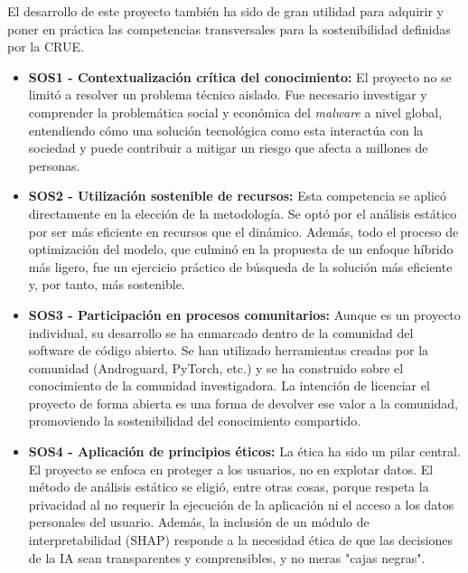 El desarrollo de este proyecto también ha sido de gran utilidad para adquirir y poner en práctica las competencias transversales para la sostenibilidad definidas por la CRUE.

\begin{itemize}
	\item \textbf{SOS1 - Contextualización crítica del conocimiento:} El proyecto no se limitó a resolver un problema técnico aislado. Fue necesario investigar y comprender la problemática social y económica del \textit{malware} a nivel global, entendiendo cómo una solución tecnológica como esta interactúa con la sociedad y puede contribuir a mitigar un riesgo que afecta a millones de personas.
	
	\item \textbf{SOS2 - Utilización sostenible de recursos:} Esta competencia se aplicó directamente en la elección de la metodología. Se optó por el análisis estático por ser más eficiente en recursos que el dinámico. Además, todo el proceso de optimización del modelo, que culminó en la propuesta de un enfoque híbrido más ligero, fue un ejercicio práctico de búsqueda de la solución más eficiente y, por tanto, más sostenible.
	
	\item \textbf{SOS3 - Participación en procesos comunitarios:} Aunque es un proyecto individual, su desarrollo se ha enmarcado dentro de la comunidad del software de código abierto. Se han utilizado herramientas creadas por la comunidad (Androguard, PyTorch, etc.) y se ha construido sobre el conocimiento de la comunidad investigadora. La intención de licenciar el proyecto de forma abierta es una forma de devolver ese valor a la comunidad, promoviendo la sostenibilidad del conocimiento compartido.
	
	\item \textbf{SOS4 - Aplicación de principios éticos:} La ética ha sido un pilar central. El proyecto se enfoca en proteger a los usuarios, no en explotar datos. El método de análisis estático se eligió, entre otras cosas, porque respeta la privacidad al no requerir la ejecución de la aplicación ni el acceso a los datos personales del usuario. Además, la inclusión de un módulo de interpretabilidad (SHAP) responde a la necesidad ética de que las decisiones de la IA sean transparentes y comprensibles, y no meras "cajas negras".
\end{itemize}